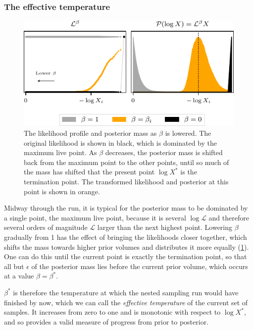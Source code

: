 \documentclass[usenatbib]{mnras}
\begin{document}
\subsubsection*{The effective temperature}
\begin{figure}
\begin{center}
	\includegraphics{figures/last_live_point.pdf}
\end{center}
\caption{The likelihood profile and posterior mass as $\beta$ is lowered. The original likelihood is shown in black, which is dominated by the maximum live point. As $\beta$ decreases, the posterior mass is shifted back from the maximum point to the other points, until so much of the mass has shifted that the present point $\log X^{*}$ is the termination point. The transformed likelihood and posterior at this point is shown in orange.}
\label{fig:last_live_point}
\end{figure}
Midway through the run, it is typical for the posterior mass to be dominated by a single point, the maximum live point, because it is several $\log \mathcal{L}$ and therefore several orders of magnitude $\mathcal{L}$ larger than the next highest point. Lowering $\beta$ gradually from 1 has the effect of bringing the likelihoods closer together, which shifts the mass towards higher prior volumes and distributes it more equally (\cref{fig:last_live_point}). One can do this until the current point is exactly the termination point, so that all but $\epsilon$ of the posterior mass lies before the current prior volume, which occurs at a value $\beta = \beta^{*}$. 
\par
$\beta^{*}$ is therefore the temperature at which the nested sampling run would have finished by now, which we can call the \textit{effective temperature} of the current set of samples. It increases from zero to one and is monotonic with respect to $\log X^{*}$, and so provides a valid measure of progress from prior to posterior.
\end{document}
